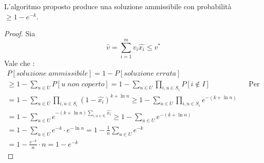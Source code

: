\begin{theorem}
    L'algoritmo proposto produce una soluzione ammissibile con probabilità $\geq 1 - e^{-k}$.
\end{theorem}
\begin{proof}
    Sia $$\hat{v} = \sum_{i = 1}^{m} v_i\hat{x_i} \leq v^*$$
    Vale che : 
    \begin{equation}
        \begin{aligned}
            P[\mathit{soluzione \; ammissibile}] = 1 - P[\mathit{soluzione\;errata}] \\
            \geq 1 - \sum_{u \in U} P[\mathit{u \; non \; coperto}] = 1 - \sum_{u \in U} \prod_{i,u\in S_i}P[i \notin I]&& \text{Per union bound}\\
            = 1 - \sum_{u \in U} \prod_{i,u\in S_i}(1 - \hat{x_i})^{k+\ln n}\geq
            1 - \sum_{u \in U} \prod_{i,u\in S_i}e^{-(k+\ln n)}\\
            = 1 - \sum_{u \in U}e^{-(k+\ln n)\sum_{i,u\in S_i}\hat{x_i}} \geq 
            1 - \sum_{u \in U}e^{-(k+\ln n)}\\
            = 1 - \sum_{u \in U}e^{-k}\cdot e^{-\ln n} = 1 - \frac{1}{n}\sum_{u \in U}e^{-k}\\
            = 1 - \frac{e^{-k}}{n} \cdot n = 1 - e^{-k}
        \end{aligned}
    \end{equation}
\end{proof}
